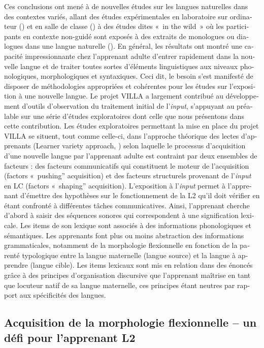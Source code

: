 \documentclass[output=paper]{langscibook}
\begin{document}
\begin{otherlanguage}{french}
Ces conclusions ont mené à de nouvelles études sur les langues naturelles dans des contextes variés, allant des études expérimentales en laboratoire sur ordinateur (\citealt{KempeBrooks2008}) et en salle de classe (\citealt{Rast2008, DimrothEtAl2013}) à des études dites «~in the wild~» où les participants en contexte non-guidé sont exposés à des extraits de monologues ou dialogues dans une langue naturelle (\citealt{GullbergEtAl2012, HanLiu2013}). En général, les résultats ont montré une capacité impressionnante chez l’apprenant adulte d’entrer rapidement dans la nouvelle langue et de traiter toutes sortes d’éléments linguistiques aux niveaux phonologiques, morphologiques et syntaxiques. Ceci dit, le besoin s’est manifesté de disposer de méthodologies appropriées et cohérentes pour les études sur l’exposition à une nouvelle langue. Le projet VILLA a largement contribué au développement d’outils d’observation du traitement initial de l’\textit{input}, s’appuyant au préalable sur une série d’études exploratoires dont celle que nous présentons dans cette contribution. Les études exploratoires permettant la mise en place du projet VILLA se situent, tout comme celle-ci, dans l’approche théorique des lectes d’apprenants (Learner variety approach, \citealt{KleinPerdue1997}) selon laquelle le processus d’acquisition d’une nouvelle langue par l’apprenant adulte est contraint par deux ensembles de facteurs : des facteurs communicatifs qui constituent le moteur de l’acquisition (factors «~pushing” acquisition) et des facteurs structurels provenant de l’\textit{input} en LC (factors «~shaping” acquisition). L’exposition à l’\textit{input} permet à l’apprenant d’émettre des hypothèses sur le fonctionnement de la L2 qu’il doit vérifier en étant confronté à différentes tâches communicatives. Ainsi, l’apprenant cherche d’abord à saisir des séquences sonores qui correspondent à une signification lexicale. Les items de son lexique sont associés à des informations phonologiques et sémantiques. Les apprenants font plus ou moins abstraction des informations grammaticales, notamment de la morphologie flexionnelle en fonction de la parenté typologique entre la langue maternelle (langue source) et la langue à apprendre (langue cible). Les items lexicaux sont mis en relation dans des énoncés grâce à des principes d’organisation discursive que l’apprenant maîtrise en tant que locuteur natif de sa langue maternelle, ces principes étant neutres par rapport aux spécificités des langues.


\subsection{Acquisition de la morphologie flexionnelle – un défi pour l’apprenant L2}\label{sec:watorek:2.2}


\end{otherlanguage}
\end{document}

